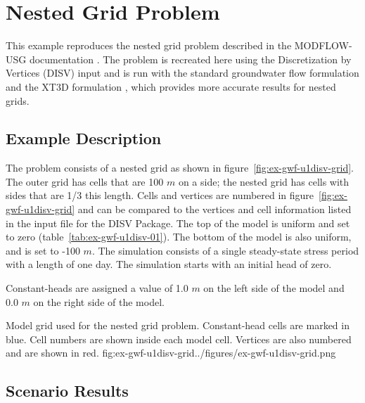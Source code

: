\section{Nested Grid Problem}

This example reproduces the nested grid problem described in the MODFLOW-USG documentation \citep{modflowusg}.  The problem is recreated here using the Discretization by Vertices (DISV) input and is run with the standard groundwater flow formulation and the XT3D  formulation \citep{modflow6xt3d}, which provides more accurate results for nested grids.  

\subsection{Example Description}
The problem consists of a nested grid as shown in figure~\ref{fig:ex-gwf-u1disv-grid}.  The outer grid has cells that are 100 $m$ on a side; the nested grid has cells with sides that are 1/3 this length.  Cells and vertices are numbered in figure~\ref{fig:ex-gwf-u1disv-grid} and can be compared to the vertices and cell information listed in the input file for the DISV Package.  The top of the model is uniform and set to zero (table~\ref{tab:ex-gwf-u1disv-01}).  The bottom of the model is also uniform, and is set to -100 $m$.  The simulation consists of a single steady-state stress period with a length of one day.  The simulation starts with an initial head of zero. 

Constant-heads are assigned a value of 1.0 $m$ on the left side of the model and 0.0 $m$ on the right side of the model.  


\begin{StandardFigure}{
                                     Model grid used for the nested grid problem.  Constant-head cells are marked in blue.  Cell numbers are shown inside each model cell.  Vertices are also numbered and are shown in red.  
                                     }{fig:ex-gwf-u1disv-grid}{../figures/ex-gwf-u1disv-grid.png}
\end{StandardFigure}                                 




\subsection{Scenario Results}

